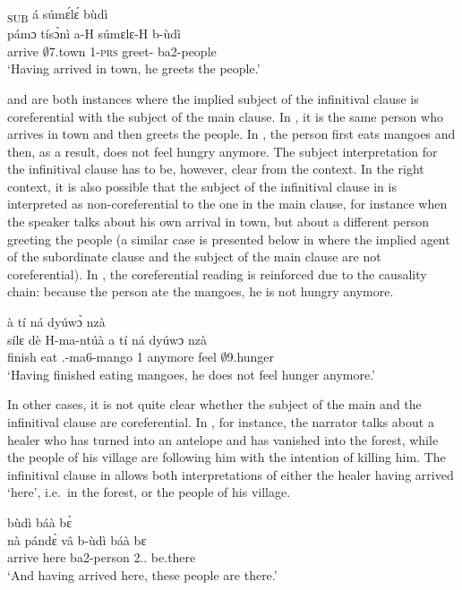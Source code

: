 \ea\label{INFpre1}
  \glll    [pámɔ̀ tísɔ̀nì]\textsubscript{SUB} á súmɛ́lɛ́ bùdì\\
            {\db}pámɔ tísɔ̀nì a-H súmɛlɛ-H b-ùdì \\
             {\db}arrive $\emptyset$7.town 1-\textsc{prs} greet-{\R} ba2-people\\
    \trans `Having arrived in town, he greets the people.'
\z

 and  are both instances where the implied subject of the infinitival clause is coreferential with the subject of the main clause. In , it is the same person who arrives in town and then greets the people. In , the person first eats mangoes and then, as a result, does not feel hungry anymore. The subject interpretation for the infinitival clause has to be, however, clear from the context. In the right context, it is also possible that the subject of the infinitival clause in  is interpreted as non-coreferential to the one in the main clause, for instance when the speaker talks about his own arrival in town, but about a different person greeting the people (a similar case is presented below in  where the implied agent of the subordinate clause and the subject of the main clause are not coreferential). In , the coreferential reading is reinforced due to the causality chain: because the person ate the mangoes, he is not hungry anymore.


\ea\label{INFpre2}
  \glll   [sílɛ dè mántúà]\textsubscript{{\SUB}} à tí ná dyúwɔ̀ nzà\\
           {\db}sílɛ dè H-ma-ntúà a tí ná dyúwɔ nzà\\
              {\db}finish eat {\OBJ}.{\LINK}-ma6-mango 1 {\NEG} anymore feel $\emptyset$9.hunger\\
    \trans `Having finished eating mangoes, he does not feel hunger anymore.'
\z


In other cases, it is not quite clear whether the subject of the main and the infinitival clause are coreferential. In , for instance, the narrator talks about a healer who has turned into an  antelope and has vanished into the forest, while the people of his village are following him with the intention of killing him. The infinitival clause in  allows both interpretations of either the healer having arrived `here', i.e.\ in the forest, or the people of his village.


\ea\label{INFpre3}
  \glll   [nà pándɛ̀ vâ]\textsubscript{{\SUB}} bùdì báà bɛ̀ \\
          {\db}nà pándɛ̀ vâ b-ùdì báà bɛ \\
      {\db}{\COM} arrive here ba2-person 2.{\DEM}.{\PROX} be.there   \\
    \trans `And having arrived here, these people are there.'
\z



